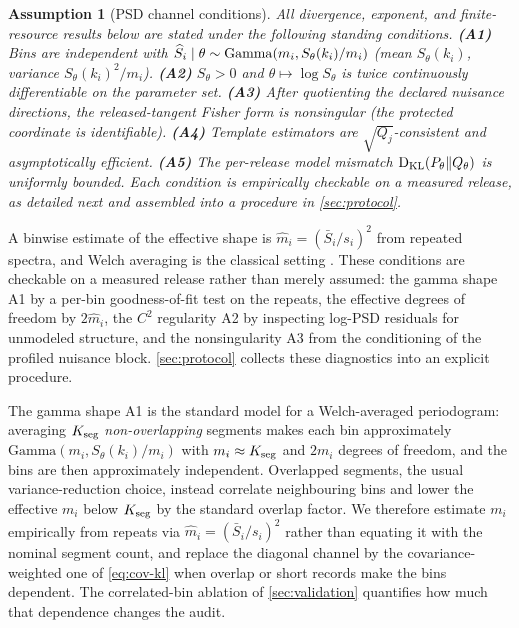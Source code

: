 \documentclass[11pt]{article}
\newtheorem{assumption}{Assumption}
\DeclareMathOperator{\KL}{D_{\rm KL}}
\begin{document}
\begin{assumption}[PSD channel conditions]
\label{ass:psd}
All divergence, exponent, and finite-resource results below are stated under the following standing conditions. \textbf{(A1)} Bins are independent with \(\widehat S_i\mid\theta\sim{\rm Gamma}(m_i,S_\theta(k_i)/m_i)\) (mean \(S_\theta(k_i)\), variance \(S_\theta(k_i)^2/m_i\)). \textbf{(A2)} \(S_\theta>0\) and \(\theta\mapsto\log S_\theta\) is twice continuously differentiable on the parameter set. \textbf{(A3)} After quotienting the declared nuisance directions, the released-tangent Fisher form is nonsingular (the protected coordinate is identifiable). \textbf{(A4)} Template estimators are \(\sqrt{Q_j}\)-consistent and asymptotically efficient. \textbf{(A5)} The per-release model mismatch \(\KL(P_\theta\Vert Q_\theta)\) is uniformly bounded. Each condition is empirically checkable on a measured release, as detailed next and assembled into a procedure in \cref{sec:protocol}.
\end{assumption}

A binwise estimate of the effective shape is \(\widehat m_i=(\bar S_i/s_i)^2\) from repeated spectra, and Welch averaging is the classical setting \cite{welch1967}. These conditions are checkable on a measured release rather than merely assumed: the gamma shape A1 by a per-bin goodness-of-fit test on the repeats, the effective degrees of freedom by \(2\widehat m_i\), the \(C^2\) regularity A2 by inspecting log-PSD residuals for unmodeled structure, and the nonsingularity A3 from the conditioning of the profiled nuisance block. \cref{sec:protocol} collects these diagnostics into an explicit procedure.

The gamma shape A1 is the standard model for a Welch-averaged periodogram: averaging \(K_{\rm seg}\) \emph{non-overlapping} segments makes each bin approximately \(\mathrm{Gamma}(m_i,S_\theta(k_i)/m_i)\) with \(m_i\approx K_{\rm seg}\) and \(2m_i\) degrees of freedom, and the bins are then approximately independent. Overlapped segments, the usual variance-reduction choice, instead correlate neighbouring bins and lower the effective \(m_i\) below \(K_{\rm seg}\) by the standard overlap factor. We therefore estimate \(m_i\) empirically from repeats via \(\widehat m_i=(\bar S_i/s_i)^2\) rather than equating it with the nominal segment count, and replace the diagonal channel by the covariance-weighted one of \eqref{eq:cov-kl} when overlap or short records make the bins dependent. The correlated-bin ablation of \cref{sec:validation} quantifies how much that dependence changes the audit.
\end{document}
